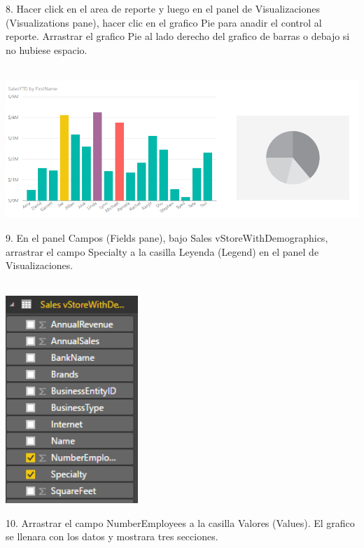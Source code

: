 \documentclass[12pt,letterpaper]{article}
\begin{document}
8. Hacer click en el area de reporte y luego en el panel de Visualizaciones (Visualizations pane), hacer clic en el
grafico Pie para anadir el control al reporte. Arrastrar el grafico Pie al lado derecho del grafico de barras o
debajo si no hubiese espacio.\\\\
\begin{center}
\includegraphics[width=14cm]{IMG/25.png} 
\end{center}
9. En el panel Campos (Fields pane), bajo Sales vStoreWithDemographics, arrastrar el campo Specialty a la
casilla Leyenda (Legend) en el panel de Visualizaciones.\\\\
\begin{center}
\includegraphics[width=5cm]{IMG/26.png} 
\end{center}
10. Arrastrar el campo NumberEmployees a la casilla Valores (Values). El grafico se llenara con los datos y
mostrara tres secciones.\\\\
\end{document}
